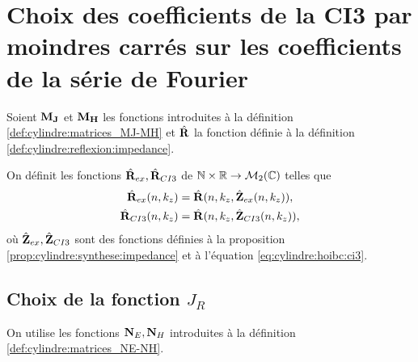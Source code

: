 \section[Choix 2 du calcul des coefficients de la CI3]{Choix des coefficients de la CI3 par moindres carrés sur les coefficients de la série de Fourier}

  Soient \(\mathbf{M}_{\mathbf{J}}\) et \(\mathbf{M}_{\mathbf{H}}\) les fonctions introduites à la définition \ref{def:cylindre:matrices_MJ-MH} et \(\hat{\mathbf{R}}\) la fonction définie à la définition \ref{def:cylindre:reflexion:impedance}.

  \begin{defn}%
    \label{def:cylindre:minimisation:matrices_MR}
    On définit les fonctions \(\hat{\mathbf{R}}_{ex}, \hat{\mathbf{R}}_{CI3}\) de \(\mathbb N\times\mathbb R  \rightarrow \mathcal{M}_2(\mathbb C)\) telles que
    \begin{align*}
      \hat{\mathbf{R}}_{ex}(n,k_z) &= \hat{\mathbf{R}}(n,k_z, \hat{\mathbf{Z}}_{ex}(n,k_z)),
      \\
      \hat{\mathbf{R}}_{CI3}(n,k_z) &= \hat{\mathbf{R}}(n,k_z, \hat{\mathbf{Z}}_{CI3}(n,k_z)),
    \end{align*}
    où \(\hat{\mathbf{Z}}_{ex},\hat{\mathbf{Z}}_{CI3}\) sont des fonctions définies à la proposition \ref{prop:cylindre:synthese:impedance} et à l'équation \eqref{eq:cylindre:hoibc:ci3}.
  \end{defn}

  \subsection[Choix de la fonction JR]{Choix de la fonction \(J_R\)}

    On utilise les fonctions \(\mathbf{N}_E, \mathbf{N}_H\) introduites à la définition \ref{def:cylindre:matrices_NE-NH}.

